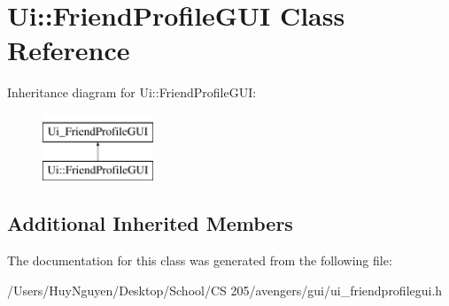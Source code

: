 \hypertarget{classUi_1_1FriendProfileGUI}{}\section{Ui\+:\+:Friend\+Profile\+G\+UI Class Reference}
\label{classUi_1_1FriendProfileGUI}
Inheritance diagram for Ui\+:\+:Friend\+Profile\+G\+UI\+:\begin{figure}[H]
\begin{center}
\leavevmode
\includegraphics[height=2.000000cm]{classUi_1_1FriendProfileGUI}
\end{center}
\end{figure}
\subsection*{Additional Inherited Members}


The documentation for this class was generated from the following file\+:\begin{DoxyCompactItemize}
\item 
/\+Users/\+Huy\+Nguyen/\+Desktop/\+School/\+C\+S 205/avengers/gui/ui\+\_\+friendprofilegui.\+h\end{DoxyCompactItemize}
